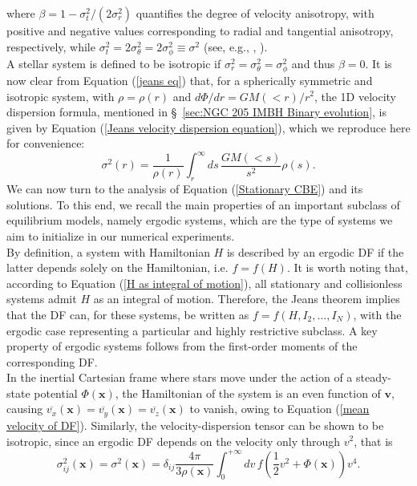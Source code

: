 \documentclass[12pt,twoside,openany]{book}
\begin{document}
where $\beta=1-\sigma_t^2/(2\sigma_r^2)$ quantifies the degree of velocity anisotropy, with positive and negative values corresponding to radial and tangential anisotropy, respectively, while $\sigma_t^2=2\sigma_\theta^2=2\sigma_\phi^2\equiv \sigma^2$ (see, e.g., \citealt{Saslaw_1985}, \citealt{Binney_book}).\\A stellar system is defined to be isotropic if $\sigma_r^2=\sigma_\theta^2=\sigma_\phi^2$ and thus $\beta=0$. It is now clear from Equation (\ref{jeans eq}) that, for a spherically symmetric and isotropic system, with $\rho=\rho(r)$ and $d\Phi/dr=GM(<r)/r^2$, the 1D velocity dispersion formula, mentioned in \S~\ref{sec:NGC 205 IMBH Binary evolution}, is given by Equation (\ref{Jeans velocity dispersion equation}), which we reproduce here for convenience:
\begin{equation}
\sigma^2(r) =
\frac{1}{\rho(r)}
\int_r^\infty ds\,
\frac{G M(<s)}{s^2}\rho(s).
\end{equation}
We can now turn to the analysis of Equation (\ref{Stationary CBE}) and its solutions. To this end, we recall the main properties of an important subclass of equilibrium models, namely ergodic systems, which are the type of systems we aim to initialize in our numerical experiments.\\By definition, a system with Hamiltonian $H$ is described by an ergodic DF if the latter depends solely on the Hamiltonian, i.e. $f=f(H)$. It is worth noting that, according to Equation (\ref{H as integral of motion}), all stationary and collisionless systems admit $H$ as an integral of motion. Therefore, the Jeans theorem implies that the DF can, for these systems, be written as $f=f(H,I_2,\ldots,I_N)$, with the ergodic case representing a particular and highly restrictive subclass. A key property of ergodic systems follows from the first-order moments of the corresponding DF.\\In the inertial Cartesian frame where stars move under the action of a steady-state potential $\Phi(\mathbf{x})$, the Hamiltonian of the system is an even function of $\mathbf{v}$, causing $\overline{v_x}(\mathbf{x})=\overline{v_y}(\mathbf{x})=\overline{v_z}(\mathbf{x})$ to vanish, owing to Equation (\ref{mean velocity of DF}). Similarly, the velocity-dispersion tensor can be shown to be isotropic, since an ergodic DF depends on the velocity only through $v^2$, that is
\begin{equation}
 \sigma_{ij}^2(\mathbf{x})=\sigma^2(\mathbf{x})=\delta_{ij}\frac{4\pi}{3\rho(\mathbf{x})}\int_{0}^{+\infty}dv\,f\left(\frac{1}{2}v^2+\Phi(\mathbf{x})\right)v^4.
\end{equation}
\end{document}
